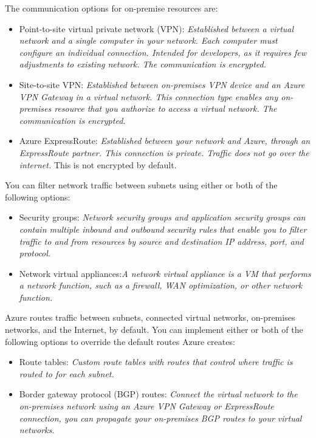 The communication options for on-premise resources are:
\begin{itemize}
\item Point-to-site virtual private network (VPN): \textit{Established between a virtual network and a single computer in your network. Each computer must configure an individual connection. Intended for developers, as it requires few adjustments to existing network. The communication is encrypted.}
\item Site-to-site VPN: \textit{Established between on-premises VPN device and an Azure VPN Gateway in a virtual network. This connection type enables any on-premises resource that you authorize to access a virtual network. The communication is encrypted.}
\item Azure ExpressRoute: \textit{Established between your network and Azure, through an ExpressRoute partner. This connection is private. Traffic does not go over the internet.} This is not encrypted by default.
\end{itemize}

You can filter network traffic between subnets using either or both of the following options:
\begin{itemize}
\item Security groups: \textit{Network security groups and application security groups can contain multiple inbound and outbound security rules that enable you to filter traffic to and from resources by source and destination IP address, port, and protocol.}
\item Network virtual appliances:\textit{A network virtual appliance is a VM that performs a network function, such as a firewall, WAN optimization, or other network function.}
\end{itemize}

Azure routes traffic between subnets, connected virtual networks, on-premises networks, and the Internet, by default. You can implement either or both of the following options to override the default routes Azure creates:
\begin{itemize}
\item Route tables: \textit{Custom route tables with routes that control where traffic is routed to for each subnet.}
\item Border gateway protocol (BGP) routes: \textit{Connect the virtual network to the on-premises network using an Azure VPN Gateway or ExpressRoute connection, you can propagate your on-premises BGP routes to your virtual networks. }
\end{itemize}

